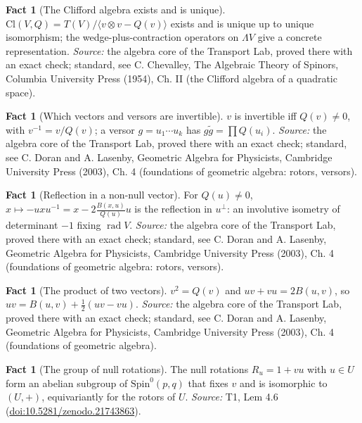 \documentclass[11pt]{article}
\theoremstyle{definition}
\newtheorem{fact}[theorem]{Fact}
\theoremstyle{plain}
\providecommand{\Cl}{}\renewcommand{\Cl}{\mathrm{Cl}}
\providecommand{\Spin}{}\renewcommand{\Spin}{\mathrm{Spin}}
\begin{document}
\begin{fact}[The Clifford algebra exists and is unique]\label{c:std-algebra.existence-uniqueness}
$\Cl(V, Q) = T(V)/\langle v \otimes v - Q(v) \rangle$ exists and is unique up to unique isomorphism; the wedge-plus-contraction operators on $\Lambda V$ give a concrete representation.
\emph{Source:} the algebra core of the Transport Lab, proved there with an exact check; standard, see C. Chevalley, The Algebraic Theory of Spinors, Columbia University Press (1954), Ch. II (the Clifford algebra of a quadratic space).
\end{fact}

\begin{fact}[Which vectors and versors are invertible]\label{c:std-algebra.inverse-of-vector}
$v$ is invertible iff $Q(v) \ne 0$, with $v^{-1} = v/Q(v)$; a versor $g = u_1 \cdots u_k$ has $g\tilde{g} = \prod Q(u_i)$.
\emph{Source:} the algebra core of the Transport Lab, proved there with an exact check; standard, see C. Doran and A. Lasenby, Geometric Algebra for Physicists, Cambridge University Press (2003), Ch. 4 (foundations of geometric algebra: rotors, versors).
\end{fact}

\begin{fact}[Reflection in a non-null vector]\label{c:std-algebra.reflection}
For $Q(u) \ne 0$, $x \mapsto -uxu^{-1} = x - 2\frac{B(x,u)}{Q(u)}u$ is the reflection in $u^{\perp}$: an involutive isometry of determinant $-1$ fixing $\operatorname{rad} V$.
\emph{Source:} the algebra core of the Transport Lab, proved there with an exact check; standard, see C. Doran and A. Lasenby, Geometric Algebra for Physicists, Cambridge University Press (2003), Ch. 4 (foundations of geometric algebra: rotors, versors).
\end{fact}

\begin{fact}[The product of two vectors]\label{c:std-algebra.vector-squares}
$v^{2} = Q(v)$ and $uv + vu = 2B(u, v)$, so $uv = B(u, v) + \tfrac12(uv - vu)$.
\emph{Source:} the algebra core of the Transport Lab, proved there with an exact check; standard, see C. Doran and A. Lasenby, Geometric Algebra for Physicists, Cambridge University Press (2003), Ch. 4 (foundations of geometric algebra).
\end{fact}

\begin{fact}[The group of null rotations]\label{c:transport.group-null-rotations}
The null rotations $R_u = 1 + vu$ with $u \in U$ form an abelian subgroup of $\Spin^0(p,q)$ that fixes $v$ and is isomorphic to $(U, +)$, equivariantly for the rotors of $U$.
\emph{Source:} T1, Lem 4.6 (\href{https://doi.org/10.5281/zenodo.21743863}{doi:10.5281/zenodo.21743863}).
\end{fact}
\end{document}
